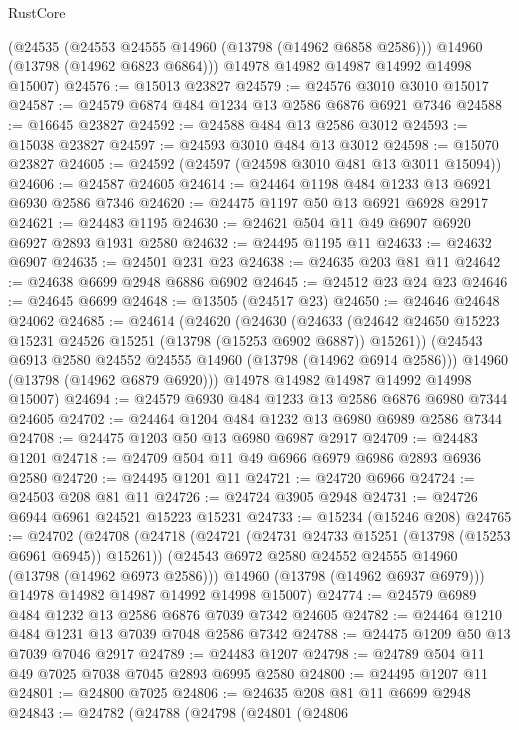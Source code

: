 \begin{lexlean}{RustCore}
\begin{coremodule}
      (@24535
        (@24553 @24555 @14960 (@13798 (@14962 @6858 @2586)))
        @14960
        (@13798 (@14962 @6823 @6864)))
      @14978
      @14982
      @14987
      @14992
      @14998
      @15007)
@24576 := @15013 @23827
@24579 := @24576 @3010 @3010 @15017
@24587 := @24579 @6874 @484 @1234 @13 @2586 @6876 @6921 @7346
@24588 := @16645 @23827
@24592 := @24588 @484 @13 @2586 @3012
@24593 := @15038 @23827
@24597 := @24593 @3010 @484 @13 @3012
@24598 := @15070 @23827
@24605 := @24592 (@24597 (@24598 @3010 @481 @13 @3011 @15094))
@24606 := @24587 @24605
@24614 := @24464 @1198 @484 @1233 @13 @6921 @6930 @2586 @7346
@24620 := @24475 @1197 @50 @13 @6921 @6928 @2917
@24621 := @24483 @1195
@24630 := @24621 @504 @11 @49 @6907 @6920 @6927 @2893 @1931 @2580
@24632 := @24495 @1195 @11
@24633 := @24632 @6907
@24635 := @24501 @231 @23
@24638 := @24635 @203 @81 @11
@24642 := @24638 @6699 @2948 @6886 @6902
@24645 := @24512 @23 @24 @23
@24646 := @24645 @6699
@24648 := @13505 (@24517 @23)
@24650 := @24646 @24648 @24062
@24685 := @24614
    (@24620
      (@24630
        (@24633 (@24642 @24650 @15223 @15231 @24526 @15251 (@13798 (@15253 @6902 @6887)) @15261))
        (@24543 @6913 @2580 @24552 @24555 @14960 (@13798 (@14962 @6914 @2586)))
        @14960
        (@13798 (@14962 @6879 @6920)))
      @14978
      @14982
      @14987
      @14992
      @14998
      @15007)
@24694 := @24579 @6930 @484 @1233 @13 @2586 @6876 @6980 @7344 @24605
@24702 := @24464 @1204 @484 @1232 @13 @6980 @6989 @2586 @7344
@24708 := @24475 @1203 @50 @13 @6980 @6987 @2917
@24709 := @24483 @1201
@24718 := @24709 @504 @11 @49 @6966 @6979 @6986 @2893 @6936 @2580
@24720 := @24495 @1201 @11
@24721 := @24720 @6966
@24724 := @24503 @208 @81 @11
@24726 := @24724 @3905 @2948
@24731 := @24726 @6944 @6961 @24521 @15223 @15231
@24733 := @15234 (@15246 @208)
@24765 := @24702
    (@24708
      (@24718
        (@24721 (@24731 @24733 @15251 (@13798 (@15253 @6961 @6945)) @15261))
        (@24543 @6972 @2580 @24552 @24555 @14960 (@13798 (@14962 @6973 @2586)))
        @14960
        (@13798 (@14962 @6937 @6979)))
      @14978
      @14982
      @14987
      @14992
      @14998
      @15007)
@24774 := @24579 @6989 @484 @1232 @13 @2586 @6876 @7039 @7342 @24605
@24782 := @24464 @1210 @484 @1231 @13 @7039 @7048 @2586 @7342
@24788 := @24475 @1209 @50 @13 @7039 @7046 @2917
@24789 := @24483 @1207
@24798 := @24789 @504 @11 @49 @7025 @7038 @7045 @2893 @6995 @2580
@24800 := @24495 @1207 @11
@24801 := @24800 @7025
@24806 := @24635 @208 @81 @11 @6699 @2948
@24843 := @24782
    (@24788
      (@24798
        (@24801
          (@24806

\end{coremodule}
\end{lexlean}
